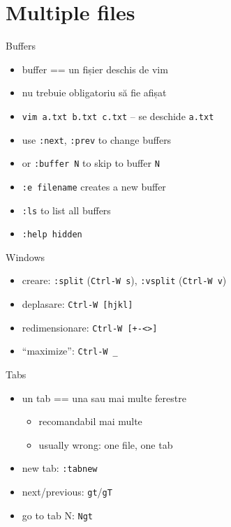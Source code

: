 \documentclass{beamer}
\begin{document}
\section{Multiple files}

\begin{frame}{Buffers}
  \begin{itemize}
    \item buffer == un fișier deschis de vim
    \item nu trebuie obligatoriu să fie afișat
    \item \texttt{vim a.txt b.txt c.txt} -- se deschide \texttt{a.txt}
    \item use \texttt{:next}, \texttt{:prev} to change buffers
    \item or \texttt{:buffer N} to skip to buffer \texttt{N}
    \item \texttt{:e filename} creates a new buffer
    \item \texttt{:ls} to list all buffers
    \item \texttt{:help hidden}
  \end{itemize}
\end{frame}

\begin{frame}{Windows}
  \begin{itemize}
    \item creare: \texttt{:split} (\texttt{Ctrl-W s}), \texttt{:vsplit}
    (\texttt{Ctrl-W v})
    \item deplasare: \texttt{Ctrl-W [hjkl]}
    \item redimensionare: \texttt{Ctrl-W [+-<>]}
    \item ``maximize'': \texttt{Ctrl-W \_}
    \pause
  \end{itemize}
\end{frame}

\begin{frame}{Tabs}
  \begin{itemize}
    \item un tab == una sau mai multe ferestre
    \pause
    \begin{itemize}
      \item recomandabil mai multe
      \item usually wrong: one file, one tab
    \end{itemize}
    \pause
    \item new tab: \texttt{:tabnew}
    \item next/previous: \texttt{gt}/\texttt{gT}
    \item go to tab N: \texttt{Ngt}
  \end{itemize}
\end{frame}
\end{document}

